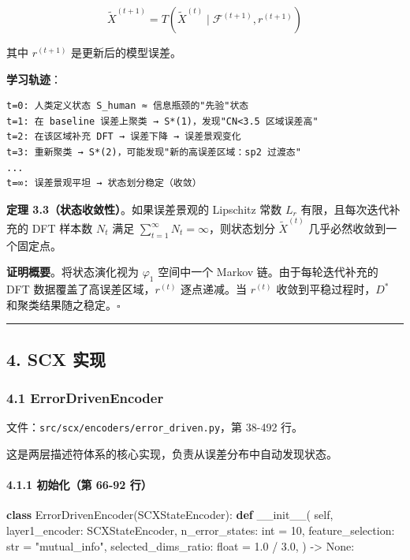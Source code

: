 \documentclass[
  12pt,
]{ctexart}
\newenvironment{Shaded}{}{}
\newcommand{\BuiltInTok}[1]{\textcolor[rgb]{0.00,0.50,0.00}{#1}}
\newcommand{\DecValTok}[1]{\textcolor[rgb]{0.25,0.63,0.44}{#1}}
\newcommand{\FloatTok}[1]{\textcolor[rgb]{0.25,0.63,0.44}{#1}}
\newcommand{\FunctionTok}[1]{\textcolor[rgb]{0.02,0.16,0.49}{#1}}
\newcommand{\KeywordTok}[1]{\textcolor[rgb]{0.00,0.44,0.13}{\textbf{#1}}}
\newcommand{\NormalTok}[1]{#1}
\newcommand{\OperatorTok}[1]{\textcolor[rgb]{0.40,0.40,0.40}{#1}}
\newcommand{\StringTok}[1]{\textcolor[rgb]{0.25,0.44,0.63}{#1}}
\newcommand{\VariableTok}[1]{\textcolor[rgb]{0.10,0.09,0.49}{#1}}
\begin{document}
\[\tilde{X}^{(t+1)} = T(\tilde{X}^{(t)} \mid \mathcal{F}^{(t+1)}, r^{(t+1)})\]

其中 \(r^{(t+1)}\) 是更新后的模型误差。

\textbf{学习轨迹}：

\begin{verbatim}
t=0: 人类定义状态 S_human ≈ 信息瓶颈的"先验"状态
t=1: 在 baseline 误差上聚类 → S*(1)，发现"CN<3.5 区域误差高"
t=2: 在该区域补充 DFT → 误差下降 → 误差景观变化
t=3: 重新聚类 → S*(2)，可能发现"新的高误差区域：sp2 过渡态"
...
t=∞: 误差景观平坦 → 状态划分稳定（收敛）
\end{verbatim}

\textbf{定理 3.3（状态收敛性）}。如果误差景观的 Lipschitz 常数 \(L_{r}\)
有限，且每次迭代补充的 DFT 样本数 \(N_t\) 满足
\(\sum_{t=1}^\infty N_t = \infty\)，则状态划分 \(\tilde{X}^{(t)}\)
几乎必然收敛到一个固定点。

\textbf{证明概要}。将状态演化视为 \(\varphi_1\) 空间中一个 Markov
链。由于每轮迭代补充的 DFT 数据覆盖了高误差区域，\(r^{(t)}\)
逐点递减。当 \(r^{(t)}\) 收敛到平稳过程时，\(D^*\)
和聚类结果随之稳定。\(\square\)

\begin{center}\rule{0.5\linewidth}{0.5pt}\end{center}

\subsection{4. SCX 实现}\label{scx-ux5b9eux73b0}

\subsubsection{4.1 ErrorDrivenEncoder}\label{errordrivenencoder}

文件：\texttt{src/scx/encoders/error\_driven.py}，第 38-492 行。

这是两层描述符体系的核心实现，负责从误差分布中自动发现状态。

\paragraph{4.1.1 初始化（第 66-92
行）}\label{ux521dux59cbux5316ux7b2c-66-92-ux884c}

\begin{Shaded}
\begin{Highlighting}[]
\KeywordTok{class}\NormalTok{ ErrorDrivenEncoder(SCXStateEncoder):}
    \KeywordTok{def} \FunctionTok{\_\_init\_\_}\NormalTok{(}
        \VariableTok{self}\NormalTok{,}
\NormalTok{        layer1\_encoder: SCXStateEncoder,}
\NormalTok{        n\_error\_states: }\BuiltInTok{int} \OperatorTok{=} \DecValTok{10}\NormalTok{,}
\NormalTok{        feature\_selection: }\BuiltInTok{str} \OperatorTok{=} \StringTok{"mutual\_info"}\NormalTok{,}
\NormalTok{        selected\_dims\_ratio: }\BuiltInTok{float} \OperatorTok{=} \FloatTok{1.0} \OperatorTok{/} \FloatTok{3.0}\NormalTok{,}
\NormalTok{    ) }\OperatorTok{{-}\textgreater{}} \VariableTok{None}\NormalTok{:}
\end{Highlighting}
\end{Shaded}
\end{document}
